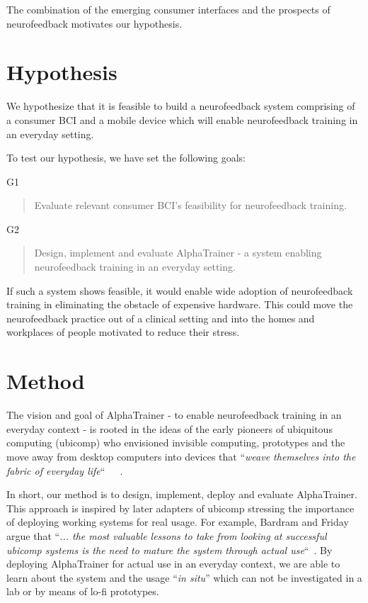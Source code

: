 \documentclass[a4paper,10pt,english,lof,lot,twoside]{puthesis}
\begin{document}
The combination of the emerging consumer interfaces and the prospects of
neurofeedback motivates our hypothesis.


\section{Hypothesis}
\label{ch-intro/index:ch-intro-hypothesis-goals}\label{ch-intro/index:hypothesis}
We hypothesize that it is feasible to build a neurofeedback system comprising of
a consumer BCI and a mobile device which will enable neurofeedback training in
an everyday setting.

To test our hypothesis, we have set the following goals:

G1
\begin{quote}

Evaluate relevant consumer BCI's feasibility for neurofeedback training.
\end{quote}

G2
\begin{quote}

Design, implement and evaluate AlphaTrainer - a system enabling
neurofeedback training in an everyday setting.
\end{quote}

If such a system shows feasible, it would enable wide adoption of
neurofeedback training in eliminating the obstacle of expensive hardware. This
could move the neurofeedback practice out of a clinical setting and into the
homes and workplaces of people motivated to reduce their stress.


\section{Method}
\label{ch-intro/index:ch-intro-method}\label{ch-intro/index:method}
The vision and goal of AlphaTrainer - to enable neurofeedback training in an everyday
context - is rooted in the ideas of the early pioneers of ubiquitous computing
(ubicomp) who envisioned invisible computing, prototypes and the move away
from desktop computers into devices that ``\emph{weave themselves into the fabric of
everyday life}`` \cite{weiser_computer_1991} \cite{weiser_world_1994} \cite{weiser_computer_1999}.

In short, our method is to design, implement, deploy and evaluate
AlphaTrainer. This approach is inspired by later adapters of ubicomp stressing
the importance of deploying working systems for real usage. For example, Bardram
and Friday argue that ``\emph{...  the most valuable lessons to take from looking at
successful ubicomp systems is the need to mature the system through actual use}`` \cite{bardram_ubiquitous_2010}. By deploying AlphaTrainer for actual
use in an everyday context, we are able to learn about the system and
the usage ``\emph{in situ}'' which can not be investigated in a lab or by means of
lo-fi prototypes.
\end{document}
